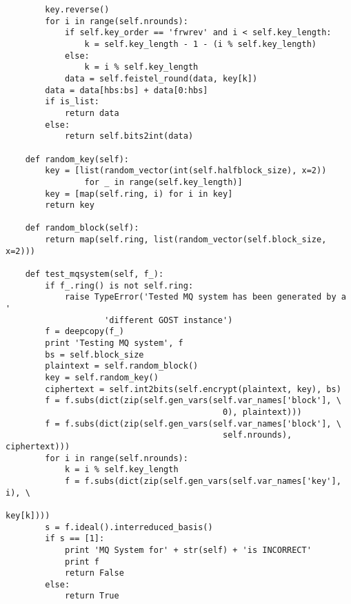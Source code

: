 \begin{appendices}
\begin{lstlisting}
        key.reverse()
        for i in range(self.nrounds):
            if self.key_order == 'frwrev' and i < self.key_length:
                k = self.key_length - 1 - (i % self.key_length)
            else:
                k = i % self.key_length
            data = self.feistel_round(data, key[k])
        data = data[hbs:bs] + data[0:hbs]
        if is_list:
            return data
        else:
            return self.bits2int(data)

    def random_key(self):
        key = [list(random_vector(int(self.halfblock_size), x=2)) 
                for _ in range(self.key_length)]
        key = [map(self.ring, i) for i in key]
        return key

    def random_block(self):
        return map(self.ring, list(random_vector(self.block_size, x=2)))

    def test_mqsystem(self, f_):
        if f_.ring() is not self.ring:
            raise TypeError('Tested MQ system has been generated by a ' 
                    'different GOST instance')
        f = deepcopy(f_)
        print 'Testing MQ system', f
        bs = self.block_size
        plaintext = self.random_block()
        key = self.random_key()
        ciphertext = self.int2bits(self.encrypt(plaintext, key), bs)
        f = f.subs(dict(zip(self.gen_vars(self.var_names['block'], \
                                            0), plaintext)))
        f = f.subs(dict(zip(self.gen_vars(self.var_names['block'], \
                                            self.nrounds), ciphertext)))
        for i in range(self.nrounds):
            k = i % self.key_length
            f = f.subs(dict(zip(self.gen_vars(self.var_names['key'], i), \
                                                                key[k])))
        s = f.ideal().interreduced_basis()
        if s == [1]:
            print 'MQ System for' + str(self) + 'is INCORRECT'
            print f
            return False
        else:
            return True



\end{lstlisting}
\end{appendices}
